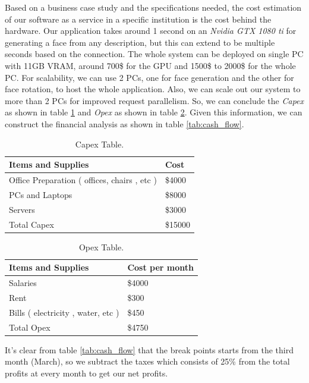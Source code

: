 \newpage

Based on a business case study and the specifications needed, the cost estimation of our software as a service in a specific institution is the cost behind the hardware. Our application takes around 1 second on an \emph{Nvidia GTX 1080 ti} for generating a face from any description, but this can extend to be multiple seconds based on the connection. The whole system can be deployed on single PC with 11GB VRAM, around 700\$ for the GPU and 1500\$ to 2000\$ for the whole PC. For scalability, we can use 2 PCs, one for face generation and the other for face rotation, to host the whole application. Also, we can scale out our system to more than 2 PCs for improved request parallelism. So, we can conclude the \emph{Capex} as shown in table \ref{tab:capex} and \emph{Opex} as shown in table \ref{tab:opex}. Given this information, we can construct the financial analysis as shown in table \ref{tab:cash_flow}.

\begin{table}[H]
\centering
\caption{Capex Table.}
\begin{tabular}[t]{| l | l |}
\hline
Items and Supplies & Cost \\
\hline \hline
 Office Preparation ( offices, chairs , etc )&  \$4000  \\
\hline
 PCs and Laptops & \$8000 \\
\hline
Servers & \$3000 \\
\hline
Total Capex & \$15000 \\
\hline
\end{tabular}
\label{tab:capex}
\end{table}

\begin{table}[H]
\centering
\caption{Opex Table.}
\begin{tabular}[t]{| l | l |}
\hline
Items and Supplies & Cost per month \\
\hline \hline
Salaries & \$4000 \\
\hline
Rent & \$300 \\
\hline
Bills ( electricity , water, etc ) & \$450\\
\hline
Total Opex & \$4750 \\
\hline
\end{tabular}
\label{tab:opex}
\end{table}

It's clear from table \ref{tab:cash_flow} that the break points starts from the third month (March), so we subtract the taxes which consists of 25\% from the total profits at every month to get our net profits.  

